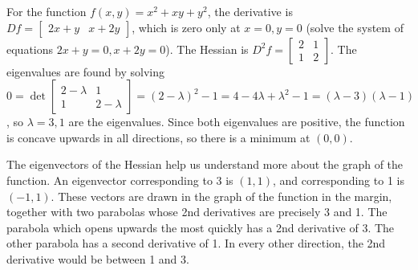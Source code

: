 \begin{example}
For the function {$f(x,y)=x^2+xy+y^2$}, the derivative is $Df = \begin{bmatrix}2x+y&x+2y \end{bmatrix}$, which is zero only at $x=0,y=0$ (solve the system of equations $2x+y=0,x+2y=0$). 
The Hessian is $D^2f = \begin{bmatrix}2&1 \\1&2\end{bmatrix}$. The eigenvalues are found by solving $0=\det \begin{bmatrix}2-\lambda &1 \\1&2-\lambda \end{bmatrix} = (2-\lambda)^2-1 = 4-4\lambda+\lambda^2 -1 = (\lambda-3)(\lambda-1)$, so $\lambda = 3,1$ are the eigenvalues.  Since both eigenvalues are positive, the function is concave upwards in all directions, so there is a minimum at $(0,0)$.  

The eigenvectors of the Hessian help us understand more about the graph of the function.  An eigenvector corresponding to 3 is $(1,1)$, and corresponding to 1 is $(-1,1)$. These vectors are drawn in the graph of the function in the margin, together with two parabolas whose 2nd derivatives are precisely 3 and 1.  The parabola which opens upwards the most quickly has a 2nd derivative of 3.  The other parabola has a second derivative of 1. In every other direction, the 2nd derivative would be between 1 and 3.
\end{example}

